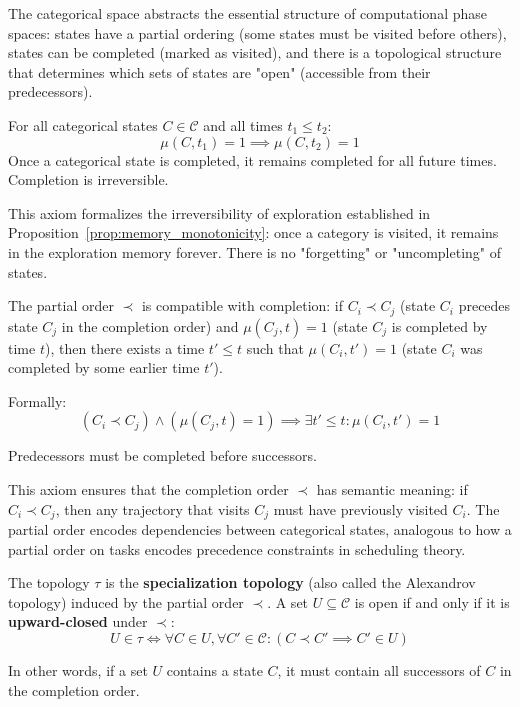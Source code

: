 The categorical space abstracts the essential structure of computational phase spaces: states have a partial ordering (some states must be visited before others), states can be completed (marked as visited), and there is a topological structure that determines which sets of states are "open" (accessible from their predecessors).

\begin{axiom}[Irreversibility]
\label{axiom:irreversibility_formal}
For all categorical states $C \in \mathcal{C}$ and all times $t_1 \leq t_2$:
\begin{equation}
\mu(C, t_1) = 1 \implies \mu(C, t_2) = 1
\label{eq:irreversibility_axiom}
\end{equation}
Once a categorical state is completed, it remains completed for all future times. Completion is irreversible.
\end{axiom}

This axiom formalizes the irreversibility of exploration established in Proposition~\ref{prop:memory_monotonicity}: once a category is visited, it remains in the exploration memory forever. There is no "forgetting" or "uncompleting" of states.

\begin{axiom}
\label{axiom:order_compat}
The partial order $\prec$ is compatible with completion: if $C_i \prec C_j$ (state $C_i$ precedes state $C_j$ in the completion order) and $\mu(C_j, t) = 1$ (state $C_j$ is completed by time $t$), then there exists a time $t' \leq t$ such that $\mu(C_i, t') = 1$ (state $C_i$ was completed by some earlier time $t'$).

Formally:
\begin{equation}
(C_i \prec C_j) \land (\mu(C_j, t) = 1) \implies \exists t' \leq t : \mu(C_i, t') = 1
\label{eq:order_compat_axiom}
\end{equation}

Predecessors must be completed before successors.
\end{axiom}

This axiom ensures that the completion order $\prec$ has semantic meaning: if $C_i \prec C_j$, then any trajectory that visits $C_j$ must have previously visited $C_i$. The partial order encodes dependencies between categorical states, analogous to how a partial order on tasks encodes precedence constraints in scheduling theory.

\begin{axiom}
\label{axiom:topology_compat}
The topology $\tau$ is the \textbf{specialization topology} (also called the Alexandrov topology) induced by the partial order $\prec$. A set $U \subseteq \mathcal{C}$ is open if and only if it is \textbf{upward-closed} under $\prec$:
\begin{equation}
U \in \tau \iff \forall C \in U, \forall C' \in \mathcal{C}: (C \prec C' \implies C' \in U)
\label{eq:topology_compat_axiom}
\end{equation}

In other words, if a set $U$ contains a state $C$, it must contain all successors of $C$ in the completion order.
\end{axiom}


